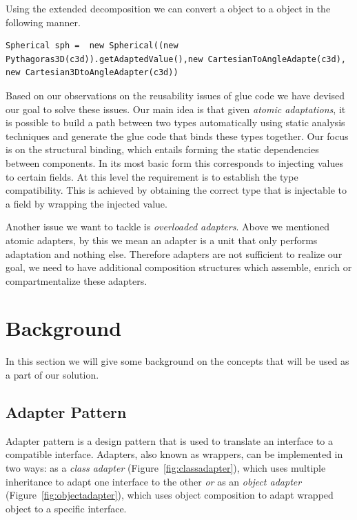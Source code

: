 Using the extended decomposition we can convert a  object to a  object in the following manner.

 \begin{lstlisting}
Spherical sph =  new Spherical((new Pythagoras3D(c3d)).getAdaptedValue(),new CartesianToAngleAdapte(c3d), new Cartesian3DtoAngleAdapter(c3d))
\end{lstlisting}


Based on our observations on the reusability issues of glue code we have devised our goal to solve these issues. Our main idea is that given \emph{atomic adaptations}, it is possible to build a path between two types automatically using static analysis techniques and generate the glue code that binds these types together. Our focus is on the structural binding, which entails forming the static dependencies between components. In its most basic form this corresponds to injecting values to certain fields. At this level the requirement is to establish the type compatibility. This is achieved by obtaining the correct type that is injectable to a field by wrapping the injected value. 

Another issue we want to tackle is \emph{overloaded adapters}. Above we mentioned atomic adapters, by this we mean an adapter is a unit that only performs adaptation and nothing else. Therefore adapters are not sufficient to realize our goal, we need to have additional composition structures which assemble, enrich or compartmentalize these adapters. 


\section{Background}
In this section we will give some background on the concepts that will be used as a part of our solution. 

\subsection{Adapter Pattern}
Adapter pattern is a design pattern that is used to translate an interface to a compatible interface. Adapters, also known as wrappers, can be implemented in two ways: as a \emph{class adapter} (Figure~\ref{fig:classadapter}), which uses multiple inheritance to adapt one interface to the other \emph{or} as an \emph{object adapter} (Figure~\ref{fig:objectadapter}), which uses object composition to adapt wrapped object to a specific interface. 


